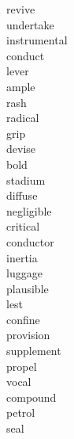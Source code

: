 \documentclass[a4paper, 11pt]{ctexart}
\begin{document}
\begin{multicols*}{3}
\begin{description}
\item[revive]

\item[undertake]

\item[instrumental]

\item[conduct]

\item[lever]

\item[ample]

\item[rash]

\item[radical]

\item[grip]

\item[devise]

\item[bold]

\item[stadium]

\item[diffuse]

\item[negligible]

\item[critical]

\item[conductor]

\item[inertia]

\item[luggage]

\item[plausible]

\item[lest]

\item[confine]

\item[provision]

\item[supplement]

\item[propel]

\item[vocal]

\item[compound]

\item[petrol]

\item[seal]


\end{description}
\end{multicols*}
\end{document}
